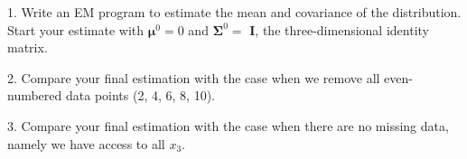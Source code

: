\documentclass{article}
\theoremstyle{definition}
\theoremstyle{definition}
\theoremstyle{remark}
\begin{document}
1. Write an EM program to estimate the mean and covariance of the distribution. Start your estimate with $\pmb{\mu}^0=0$ and $\pmb{\Sigma}^0 = $ \textbf{I}, the three-dimensional identity matrix.

2. Compare your final estimation with the case when we remove all even-numbered data points (2, 4, 6, 8, 10).

3. Compare your final estimation with the case when there are no missing data, namely we have access to all $x_3$.



\end{document}

